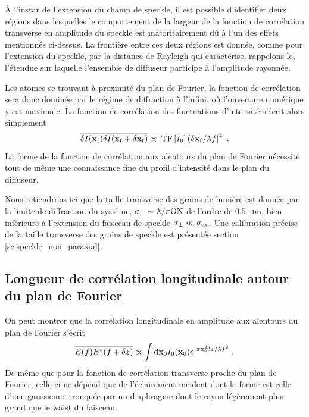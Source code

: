 À l'instar de l'extension du champ de speckle, il est possible d'identifier deux régions dans lesquelles le comportement de la largeur de la fonction de corrélation transverse en amplitude du speckle est majoritairement dû à l'un des effets mentionnés ci-dessus. La frontière entre ces deux régions est donnée, comme pour l'extension du speckle, par la distance de Rayleigh qui caractérise, rappelons-le, l'étendue sur laquelle l'ensemble de diffuseur participe à l'amplitude rayonnée.

Les atomes se trouvant à proximité du plan de Fourier, la fonction de corrélation sera donc dominée par le régime de diffraction à l'infini, où l'ouverture numérique y est maximale. La fonction de corrélation des fluctuations d'intensité s'écrit alors simplement
\begin{equation}
\overline{\delta I (\mathbf{x}_{\mathrm{f}}) \delta I (\mathbf{x}_{\mathrm{f}} + \delta \mathbf{x}_{\mathrm{f}})} \propto \left| \mathrm{TF} \left[ I_0 \right] (\delta \mathbf{x}_{\mathrm{f}} / \lambda f \right| ^2 \text{ .}
\end{equation}
La forme de la fonction de corrélation aux alentours du plan de Fourier nécessite tout de même une connaissance fine du profil d'intensité dans le plan du diffuseur. 

Nous retiendrons ici que la taille transverse des grains de lumière est donnée par la limite de diffraction du système, $\sigma_{\perp}\sim \lambda/\pi\mathrm{ON}$ de l'ordre de \SI{0.5}{\micro\metre}, bien inférieure à l'extension du faisceau de speckle $\sigma_{\perp} \ll \sigma_{\mathrm{ex}}$. Une calibration précise de la taille transverse des grains de speckle est présentée section \ref{sc:speckle_non_paraxial}.




\subsection{Longueur de corrélation longitudinale autour du plan de Fourier}

On peut montrer que la corrélation longitudinale en amplitude aux alentours du plan de Fourier s'écrit
\begin{equation}
\overline{E(f)E^*(f+\delta z)} \propto \int{\mathrm{d} \mathbf{x}_0I_0 (\mathbf{x}_0) e^{i\pi \mathbf{x}_0^2 \delta z / \lambda f^2} } \text{ .}
\end{equation}
De même que pour la fonction de corrélation transverse proche du plan de Fourier, celle-ci ne dépend que de l'éclairement incident dont la forme est celle d'une gaussienne tronquée par un diaphragme dont le rayon légèrement plus grand que le waist du faisceau.

